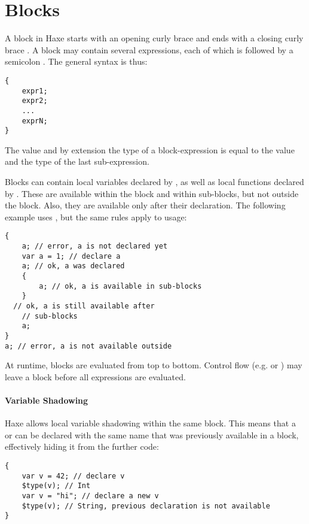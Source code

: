 \section{Blocks}
\label{expression-block}

A block in Haxe starts with an opening curly brace \expr{\{} and ends with a closing curly brace \expr{\}}. A block may contain several expressions, each of which is followed by a semicolon \expr{;}. The general syntax is thus:

\begin{lstlisting}
{
	expr1;
	expr2;
	...
	exprN;
}
\end{lstlisting}
The value and by extension the type of a block-expression is equal to the value and the type of the last sub-expression.

Blocks can contain local variables declared by , as well as local functions declared by . These are available within the block and within sub-blocks, but not outside the block. Also, they are available only after their declaration. The following example uses , but the same rules apply to  usage:

\begin{lstlisting}
{
	a; // error, a is not declared yet
	var a = 1; // declare a
	a; // ok, a was declared
	{
		a; // ok, a is available in sub-blocks
	}
  // ok, a is still available after
	// sub-blocks	
	a;
}
a; // error, a is not available outside
\end{lstlisting}
At runtime, blocks are evaluated from top to bottom. Control flow (e.g.  or ) may leave a block before all expressions
are evaluated.

\paragraph{Variable Shadowing}

Haxe allows local variable shadowing within the same block. This means that
a  or  can be declared with the same name that was
previously available in a block, effectively hiding it from the further code:

\begin{lstlisting}
{
	var v = 42; // declare v
	$type(v); // Int
	var v = "hi"; // declare a new v
	$type(v); // String, previous declaration is not available
}
\end{lstlisting}

